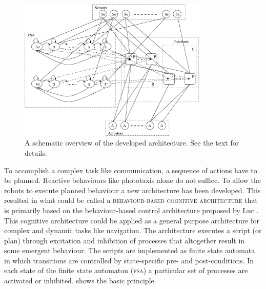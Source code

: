 
\begin{figure}[t]
\centerline{\includegraphics[width=9cm]{lang_games//fsa.eps}}
\caption{A schematic overview of the developed architecture. See the text for details.}
\label{f:architscheme}
\end{figure}

To accomplish a complex task like communication, a sequence of actions have to be planned. Reactive behaviours like phototaxis alone do not suffice. To allow the robots to execute planned behaviour a new architecture has been developed. This resulted in what could be called a {\scshape behaviour-based cognitive architecture} that is primarily based on the behaviour-based control architecture proposed by Luc \citet{steels:1994b}. This cognitive architecture could be applied as a general purpose architecture for complex and dynamic tasks like navigation. The architecture executes a script (or plan) through excitation and inhibition of processes that altogether result in some emergent behaviour. The scripts are implemented as finite state automata in which transitions are controlled by state-specific pre- and post-conditions. In each state of the finite state automaton \textsc{(fsa)} a particular set of processes are activated or inhibited.  shows the basic principle.

